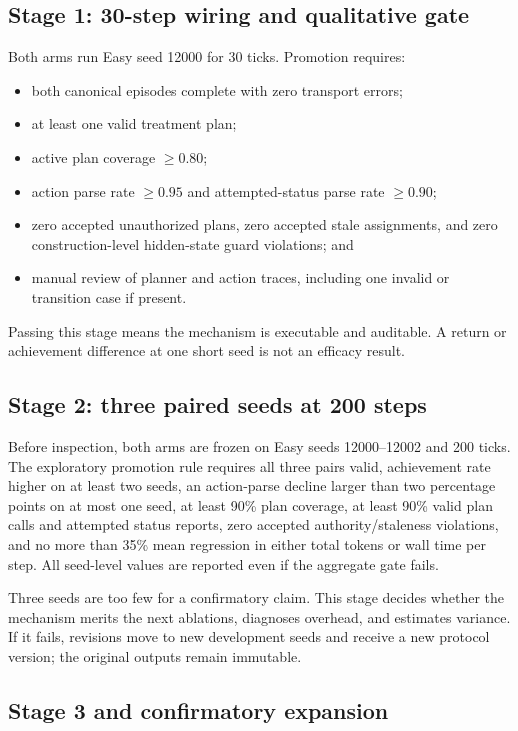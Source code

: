 \documentclass[11pt]{article}
\begin{document}
\subsection{Stage 1: 30-step wiring and qualitative gate}

Both arms run Easy seed 12000 for 30 ticks.  Promotion requires:
\begin{itemize}
  \item both canonical episodes complete with zero transport errors;
  \item at least one valid treatment plan;
  \item active plan coverage $\geq 0.80$;
  \item action parse rate $\geq 0.95$ and attempted-status parse rate $\geq 0.90$;
  \item zero accepted unauthorized plans, zero accepted stale assignments, and
  zero construction-level hidden-state guard violations; and
  \item manual review of planner and action traces, including one invalid or
  transition case if present.
\end{itemize}
Passing this stage means the mechanism is executable and auditable.  A return or
achievement difference at one short seed is not an efficacy result.

\subsection{Stage 2: three paired seeds at 200 steps}

Before inspection, both arms are frozen on Easy seeds 12000--12002 and 200 ticks.
The exploratory promotion rule requires all three pairs valid, achievement rate
higher on at least two seeds, an action-parse decline larger than two percentage
points on at most one seed, at least 90\% plan coverage, at least 90\% valid plan
calls and attempted status reports, zero accepted authority/staleness violations,
and no more than 35\% mean regression in either total tokens or wall time per
step.  All seed-level values are reported even if the aggregate gate fails.

Three seeds are too few for a confirmatory claim.  This stage decides whether the
mechanism merits the next ablations, diagnoses overhead, and estimates variance.
If it fails, revisions move to new development seeds and receive a new protocol
version; the original outputs remain immutable.

\subsection{Stage 3 and confirmatory expansion}
\end{document}
